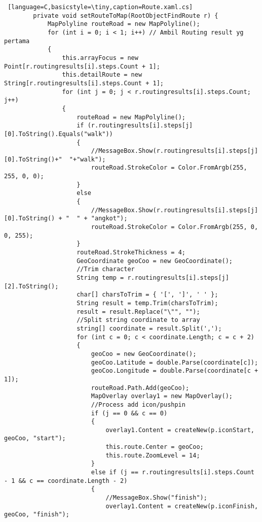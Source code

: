 \begin{lstlisting} [language=C,basicstyle=\tiny,caption=Route.xaml.cs]
        private void setRouteToMap(RootObjectFindRoute r) {
            MapPolyline routeRoad = new MapPolyline();
            for (int i = 0; i < 1; i++) // Ambil Routing result yg pertama
            {
                this.arrayFocus = new Point[r.routingresults[i].steps.Count + 1];
                this.detailRoute = new String[r.routingresults[i].steps.Count + 1];
                for (int j = 0; j < r.routingresults[i].steps.Count; j++)
                {
                    routeRoad = new MapPolyline();
                    if (r.routingresults[i].steps[j][0].ToString().Equals("walk"))
                    {
                        //MessageBox.Show(r.routingresults[i].steps[j][0].ToString()+"  "+"walk");
                        routeRoad.StrokeColor = Color.FromArgb(255, 255, 0, 0);
                    }
                    else
                    {
                        //MessageBox.Show(r.routingresults[i].steps[j][0].ToString() + "  " + "angkot");
                        routeRoad.StrokeColor = Color.FromArgb(255, 0, 0, 255);
                    }
                    routeRoad.StrokeThickness = 4;
                    GeoCoordinate geoCoo = new GeoCoordinate();
                    //Trim character
                    String temp = r.routingresults[i].steps[j][2].ToString();
                    char[] charsToTrim = { '[', ']', ' ' };
                    String result = temp.Trim(charsToTrim);
                    result = result.Replace("\"", "");
                    //Split string coordinate to array
                    string[] coordinate = result.Split(',');
                    for (int c = 0; c < coordinate.Length; c = c + 2)
                    {
                        geoCoo = new GeoCoordinate();
                        geoCoo.Latitude = double.Parse(coordinate[c]);
                        geoCoo.Longitude = double.Parse(coordinate[c + 1]);
                        routeRoad.Path.Add(geoCoo);
                        MapOverlay overlay1 = new MapOverlay();
                        //Process add icon/pushpin
                        if (j == 0 && c == 0)
                        {
                            overlay1.Content = createNew(p.iconStart, geoCoo, "start");
                            this.route.Center = geoCoo;
                            this.route.ZoomLevel = 14;
                        }
                        else if (j == r.routingresults[i].steps.Count - 1 && c == coordinate.Length - 2)
                        {
                            //MessageBox.Show("finish");
                            overlay1.Content = createNew(p.iconFinish, geoCoo, "finish");

\end{lstlisting}

